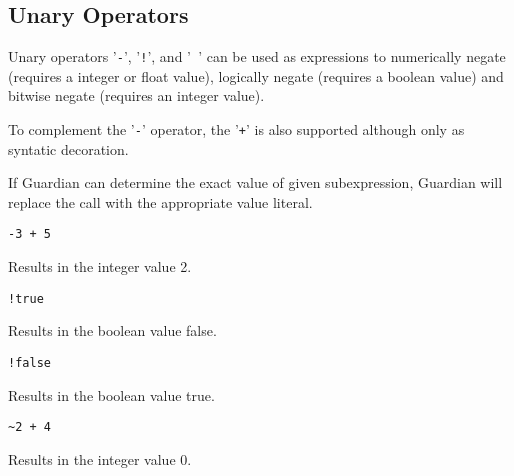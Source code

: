 
\subsection{Unary Operators}
{
	Unary operators '\texttt{-}', '\texttt{!}',
	and '\texttt{~}' can be used as expressions to
	numerically negate (requires a integer or float value),
	logically negate (requires a boolean value) and
	bitwise negate (requires an integer value).
	
	To complement the '\texttt{-}' operator, the '\texttt{+}' is also supported
	although only as syntatic decoration.
	
	If Guardian can determine the exact value of given subexpression,
	Guardian will replace the call with the appropriate value literal.
	
	\begin{itemize}
	{
		\item \texttt{-3 + 5}
		
			Results in the integer value 2.
		
		\item \texttt{!true}
		
			Results in the boolean value false.
		
		\item \texttt{!false}
		
			Results in the boolean value true.
		
		\item \texttt{\~{}2 + 4}
		
			Results in the integer value 0.
	}
	\end{itemize}
}
